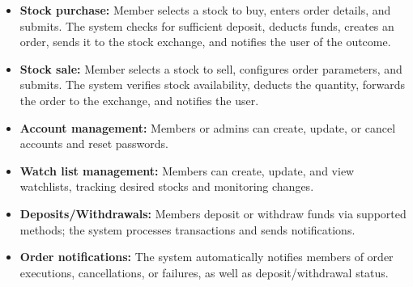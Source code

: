 \begin{itemize}
\item
\protect{}\label{uv-GKpxJiEm_bmfeCkCY2}
\textbf{Stock purchase:} Member selects a stock to buy, enters order details, and submits. The system checks for sufficient deposit, deducts funds, creates an order, sends it to the stock exchange, and notifies the user of the outcome.
\item
\protect{}\label{s8rqiVxoa6m8sUfMlOCKL}
\textbf{Stock sale:} Member selects a stock to sell, configures order parameters, and submits. The system verifies stock availability, deducts the quantity, forwards the order to the exchange, and notifies the user.
\item
\protect{}\label{qGj23UMNKGeqvnomdZdU_}
\textbf{Account management:} Members or admins can create, update, or cancel accounts and reset passwords.
\item
\protect{}\label{9tnpsyEIwuVrlSuex8-fG}
\textbf{Watch list management:} Members can create, update, and view watchlists, tracking desired stocks and monitoring changes.
\item
\protect{}\label{-yJbrgYWinTViYG4MslEf}
\textbf{Deposits/Withdrawals:} Members deposit or withdraw funds via supported methods; the system processes transactions and sends notifications.
\item
\protect{}\label{4xI01yEuZ3YhEekf022y1}
\textbf{Order notifications:} The system automatically notifies members of order executions, cancellations, or failures, as well as deposit/withdrawal status.
\end{itemize}

